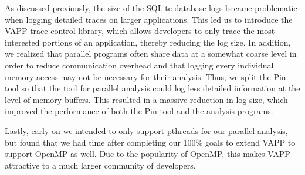 As discussed previously, the size of the SQLite database logs became
problematic when logging detailed traces on larger applications.  This
led us to introduce the VAPP trace control library, which allows
developers to only trace the most interested portions of an
application, thereby reducing the log size.  In addition, we realized
that parallel programs often share data at a somewhat coarse level in
order to reduce communication overhead and that logging every
individual memory access may not be necessary for their analysis.
Thus, we split the Pin tool so that the tool for parallel analysis
could log less detailed information at the level of memory buffers.
This resulted in a massive reduction in log size, which improved the
performance of both the Pin tool and the analysis programs.

Lastly, early on we intended to only support pthreads for our parallel
analysis, but found that we had time after completing our 100\% goals
to extend VAPP to support OpenMP as well. Due to the popularity of
OpenMP, this makes VAPP attractive to a much larger community of
developers. 


